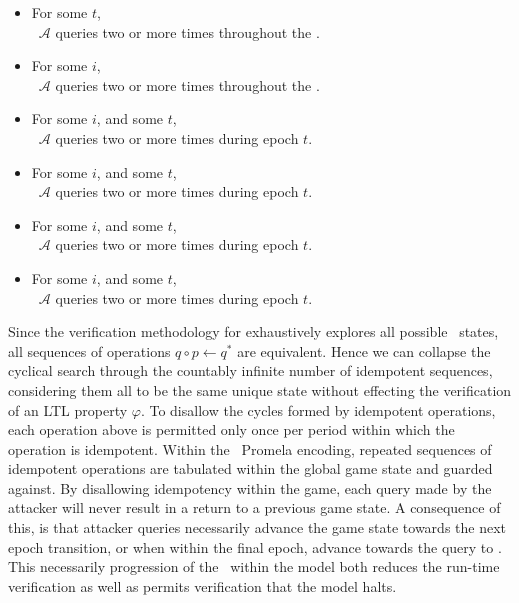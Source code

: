 \begin{itemize}
  \item For some \(t\),\\~\hspace{4em}\(\mathcal{A}\) queries     two or more times throughout the \CGKAsec.  
  \item For some \(i\),\\~\hspace{4em}\(\mathcal{A}\) queries  two or more times throughout the \CGKAsec.
  \item For some \(i\), and some \(t\),\\~\hspace{4em}\(\mathcal{A}\) queries         two or more times during epoch \(t\).
  \item For some \(i\), and some \(t\),\\~\hspace{4em}\(\mathcal{A}\) queries     two or more times during epoch \(t\).
  \item For some \(i\), and some \(t\),\\~\hspace{4em}\(\mathcal{A}\) queries  two or more times during epoch \(t\).
  \item For some \(i\), and some \(t\),\\~\hspace{4em}\(\mathcal{A}\) queries  two or more times during epoch \(t\).

\end{itemize}

Since the verification methodology for  exhaustively explores all possible \CGKAsec\ states, all sequences of operations \(q \circ p \gets q^{*}\) are equivalent.
Hence we can collapse the cyclical search through the countably infinite number of idempotent sequences, considering them all to be the same unique state without effecting the verification of an LTL property \(\varphi\).
To disallow the cycles formed by idempotent operations, each operation above is permitted only once per period within which the operation is idempotent.
Within the \CGKAmod{}{}{}\ Promela encoding, repeated sequences of idempotent operations are tabulated within the global game state and guarded against.
By disallowing idempotency within the game, each query made by the attacker will never result in a return to a previous game state.
A consequence of this, is that attacker queries necessarily advance the game state towards the next epoch transition, or when within the final epoch, advance towards the query to .
This necessarily progression of the \CGKAsec\ within the model  both reduces the run-time verification as well as permits verification that the model  halts.


